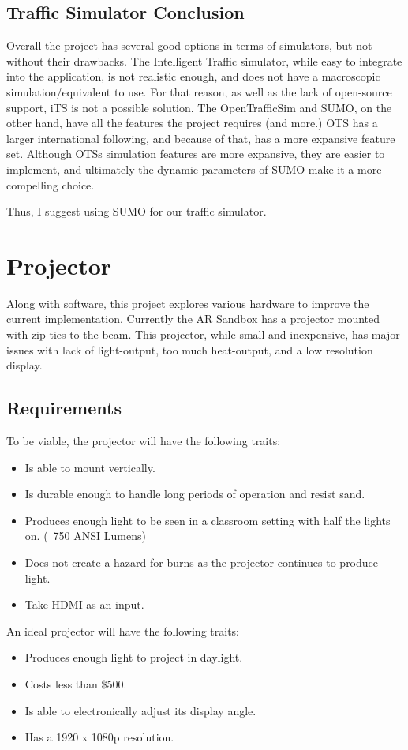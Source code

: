 \documentclass[IEEEtran]{article}
\begin{document}
\subsection{Traffic Simulator Conclusion}
\par Overall the project has several good options in terms of simulators, but not without their drawbacks. The Intelligent Traffic simulator, while easy to integrate into the application, is not realistic enough, and does not have a macroscopic simulation/equivalent to use. For that reason, as well as the lack of open-source support, iTS is not a possible solution. The OpenTrafficSim and SUMO, on the other hand, have all the features the project requires (and more.) OTS has a larger international following, and because of that, has a more expansive feature set. Although OTSs simulation features are more expansive, they are easier to implement, and ultimately the dynamic parameters of SUMO make it a more compelling choice. 
\par Thus, I suggest using SUMO for our traffic simulator.

\section{Projector}
Along with software, this project explores various hardware to improve the current implementation. Currently the AR Sandbox has a projector mounted with zip-ties to the beam. This projector, while small and inexpensive, has major issues with lack of light-output, too much heat-output, and a low resolution display. 
\subsection{Requirements}
To be viable, the projector will have the following traits: 
\begin{itemize}
    \item Is able to mount vertically.
    \item Is durable enough to handle long periods of operation and resist sand. 
    \item Produces enough light to be seen in a classroom setting with half the lights on. (~750 ANSI Lumens)
    \item Does not create a hazard for burns as the projector continues to produce light. 
    \item Take HDMI as an input. 
\end{itemize}
An ideal projector will have the following traits:  
\begin{itemize}
    \item Produces enough light to project in daylight.
    \item Costs less than \$500.
    \item Is able to electronically adjust its display angle. 
    \item Has a 1920 x 1080p resolution. 
\end{itemize}
\end{document}
